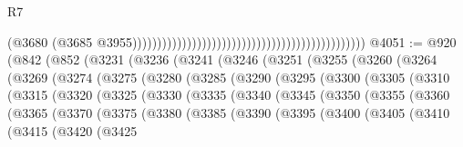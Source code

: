 \begin{lexlean}{R7}
\begin{coremodule}
                                                                                              (@3680
                                                                                                (@3685
                                                                                                  @3955)))))))))))))))))))))))))))))))))))))))))))))))
@4051 := @920
    (@842
      (@852
        (@3231
          (@3236
            (@3241
              (@3246
                (@3251
                  (@3255
                    (@3260
                      (@3264
                        (@3269
                          (@3274
                            (@3275
                              (@3280
                                (@3285
                                  (@3290
                                    (@3295
                                      (@3300
                                        (@3305
                                          (@3310
                                            (@3315
                                              (@3320
                                                (@3325
                                                  (@3330
                                                    (@3335
                                                      (@3340
                                                        (@3345
                                                          (@3350
                                                            (@3355
                                                              (@3360
                                                                (@3365
                                                                  (@3370
                                                                    (@3375
                                                                      (@3380
                                                                        (@3385
                                                                          (@3390
                                                                            (@3395
                                                                              (@3400
                                                                                (@3405
                                                                                  (@3410
                                                                                    (@3415
                                                                                      (@3420
                                                                                        (@3425

\end{coremodule}
\end{lexlean}
